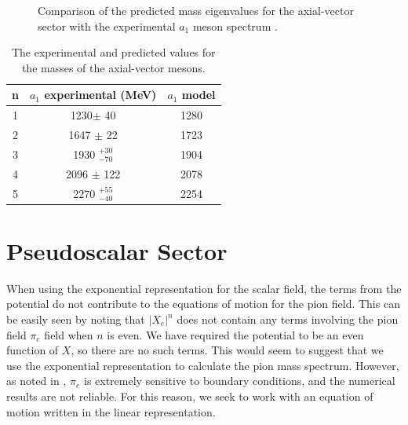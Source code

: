 \begin{figure}[htb]
\caption{Comparison of the predicted mass eigenvalues for the axial-vector sector with the experimental $a_1$ meson spectrum \cite{PDG}.}
\label{fig:axial3}
\end{figure}




\begin{table}[htb]
\center
\begin{tabular}{| c || c | c  |}
\hline
n & $a_1$ experimental (MeV) & $a_1$ model \\
\hline
1 & 1230$\pm$ 40 &	    	1280	 \\
2 & 1647 $\pm$ 22 & 	1723	 \\
3 & 1930  $^{+30}_{-70}$ & 1904\\
4 & 2096 $\pm$ 122 &      2078	 \\ 
5 & 2270 $^{+55}_{-40}$  & 2254\\
\hline
\end{tabular}
\caption{The experimental \cite{PDG} and predicted values for the masses of the axial-vector mesons.}
\label{tabAxial}
\end{table}

\section{Pseudoscalar Sector}

When using the exponential representation for the scalar field, the terms from the potential do not contribute to the equations of motion for the pion field.
This can be easily seen by noting that $|X_e|^n$ does not contain any terms involving the pion field $\pi_e$ field when $n$ is even. 
We have required the potential to be an even function of $X$, so there are no such terms.
This would seem to suggest that we use the exponential representation to calculate the pion mass spectrum.
However, as noted in \cite{bartz-pions}, $\pi_e$ is extremely sensitive to boundary conditions, and the numerical results are not reliable.
For this reason, we seek to work with an equation of motion written in the linear representation.

